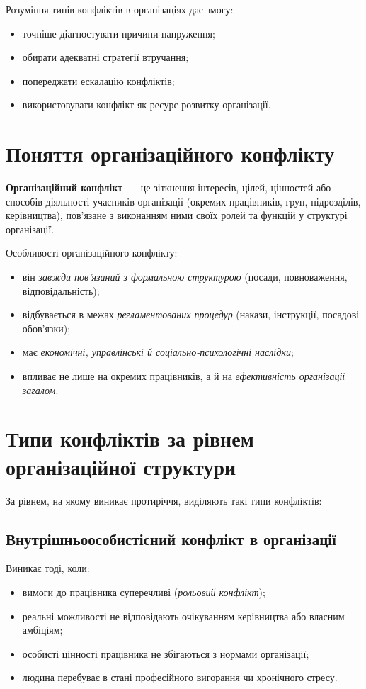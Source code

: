 \documentclass[12pt,a4paper]{article}
\begin{document}
    Розуміння типів конфліктів в організаціях дає змогу:
    \begin{itemize}
        \item точніше діагностувати причини напруження;
        \item обирати адекватні стратегії втручання;
        \item попереджати ескалацію конфліктів;
        \item використовувати конфлікт як ресурс розвитку організації.
    \end{itemize}

    \section*{Поняття організаційного конфлікту}
    \textbf{Організаційний конфлікт}~--- це зіткнення інтересів, цілей, цінностей або способів діяльності учасників 
    організації (окремих працівників, груп, підрозділів, керівництва), пов’язане з виконанням ними своїх ролей та 
    функцій у структурі організації.

    Особливості організаційного конфлікту:
    \begin{itemize}
        \item він \textit{завжди пов’язаний з формальною структурою} (посади, повноваження, відповідальність);
        \item відбувається в межах \textit{регламентованих процедур} (накази, інструкції, посадові обов’язки);
        \item має \textit{економічні, управлінські й соціально-психологічні наслідки};
        \item впливає не лише на окремих працівників, а й на \textit{ефективність організації загалом}.
    \end{itemize}

    \section*{Типи конфліктів за рівнем організаційної структури}
    За рівнем, на якому виникає протиріччя, виділяють такі типи конфліктів:

    \subsection*{Внутрішньоособистісний конфлікт в організації}
    Виникає тоді, коли:
    \begin{itemize}
        \item вимоги до працівника суперечливі (\textit{рольовий конфлікт});
        \item реальні можливості не відповідають очікуванням керівництва або власним амбіціям;
        \item особисті цінності працівника не збігаються з нормами організації;
        \item людина перебуває в стані професійного вигорання чи хронічного стресу.
    \end{itemize}
\end{document}
